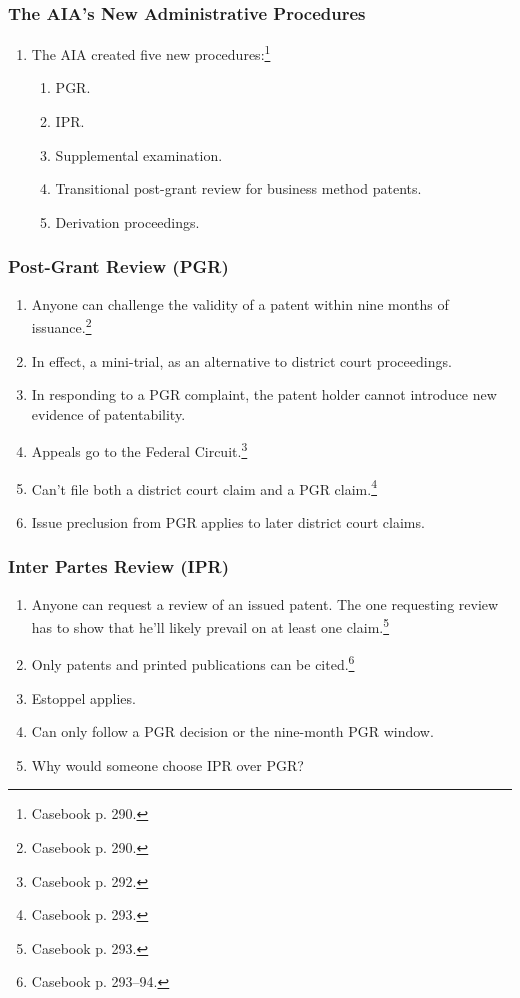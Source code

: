 \subsubsection{The AIA's New Administrative Procedures}

\begin{enumerate}
    \item The AIA created five new procedures:\footnote{Casebook p. 290.}
    \begin{enumerate}
        \item PGR.
        \item IPR.
        \item Supplemental examination.
        \item Transitional post-grant review for business method patents.
        \item Derivation proceedings.
    \end{enumerate}
\end{enumerate}

\subsubsection{Post-Grant Review (PGR)}

\begin{enumerate}
    \item Anyone can challenge the validity of a patent within nine months of 
    issuance.\footnote{Casebook p. 290.}
    \item In effect, a mini-trial, as an alternative to district court 
    proceedings.
    \item In responding to a PGR complaint, the patent holder cannot introduce 
    new evidence of patentability.
    \item Appeals go to the Federal Circuit.\footnote{Casebook p. 292.}
    \item Can't file both a district court claim and a PGR 
    claim.\footnote{Casebook p. 293.}
    \item Issue preclusion from PGR applies to later district court 
    claims.
\end{enumerate}

\subsubsection{Inter Partes Review (IPR)}

\begin{enumerate}
    \item Anyone can request a review of an issued patent. The one requesting 
    review has to show that he'll likely prevail on at least one 
    claim.\footnote{Casebook p. 293.}
    \item Only patents and printed publications can be cited.\footnote{Casebook 
    p. 293--94.}
    \item Estoppel applies.
    \item Can only follow a PGR decision or the nine-month PGR window.
    \item Why would someone choose IPR over PGR?
\end{enumerate}

